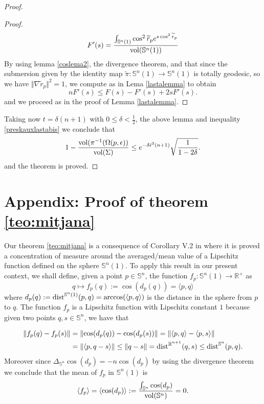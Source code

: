 \documentclass{amsart}
\theoremstyle{definition}
\theoremstyle{remark}
\newcommand{\erre}{\mathbb{R}}
\newcommand{\ese}{\mathbb{S}}
\begin{document}
\begin{proof}
\begin{proof}
    $$
F'(s)=\frac{\int_{\mathbb{S}^n(1)}\cos^2\widetilde{r}_pe^{s \cos^2\widetilde{r}_p}}{{\rm vol}(\mathbb{S}^n(1))}
    $$
 \noindent By using lemma \ref{coslema2}, the divergence theorem, and that since the submersion given by the identity map $\widetilde{\pi}: \mathbb{S}^n(1) \rightarrow \mathbb{S}^n(1)$ is totally geodesic, so we have  $\Vert \nabla\widetilde{r}_p\Vert^2=1$, we compute as in Lema \ref{lastalemma} to obtain
 $$
nF'(s)\leq  F(s)-F'(s)+2sF'(s).
 $$
 \noindent and we proceed as in the proof of Lemma \ref{lastalemma}.
\end{proof}
Taking now $t=\delta(n+1)$ with $0\leq \delta<\frac{1}{2}$, the above lemma and inequality \eqref{preskauxlastabis} we conclude that
\begin{equation}\label{lasta}
     1-\frac{{\rm vol}(\pi^{-1}(\Omega(p,\epsilon))}{{\rm vol}(\Sigma)}\leq e^{-\delta\bar\epsilon^2(n+1)}\sqrt{\frac{1}{1-2\delta}}.
\end{equation}
and the theorem is proved.

\end{proof}

\section{Appendix: Proof of theorem \ref{teo:mitjana}}\label{appendix}

Our theorem \ref{teo:mitjana}  is a consequence of Corollary V.2 in \cite{MS} where it is proved a concentration of measure around the averaged/mean value of a Lipschitz function defined on the sphere $\ese^n(1)$. To apply this result in our present context, we shall define, given a point $p\in \mathbb{S}^n$, the function $f_p: \ese^n(1) \rightarrow \erre^+$ as
$$
q\mapsto f_p(q):=\cos(d_p(q))=\langle p, q\rangle 
$$
\noindent where $d_p(q):={\rm dist}^{\ese^n(1)}(p,q)={\rm arccos}(\langle p, q\rangle)$ is the distance in the sphere from $p$ to $q$.
The function $f_p$ is a Lipschitz function with Lipschitz constant $1$ because given two points  $q,s\in \mathbb{S}^n$, we have that 

$$
\begin{aligned}
    \left\Vert f_p(q)-f_p(s)\right\Vert&=\left\Vert \cos(d_p(q))-\cos(d_p(s))\right\Vert=\Vert \langle p, q\rangle-\langle p, s\rangle \Vert \\&=\Vert \langle p, q- s\rangle \Vert
\leq \Vert q-s\Vert={\rm dist}^{\mathbb{R}^{n+1}}(q,s)
\leq  {\rm dist}^{\mathbb{S}^n}(p,q).
\end{aligned}
$$
Moreover since $\Delta_{\mathbb{S}^{n}}\cos(d_p)=-n\cos(d_p)$ by using the divergence theorem we conclude that the mean of $f_p$ in $\ese^n(1)$ is 
$$
\langle f_p \rangle=\langle \cos(d_p)\rangle:=\frac{\int_{\mathbb{S}^n}\cos(d_p)}{{\rm vol}(\mathbb{S}^n)}=0.
$$
\end{document}
